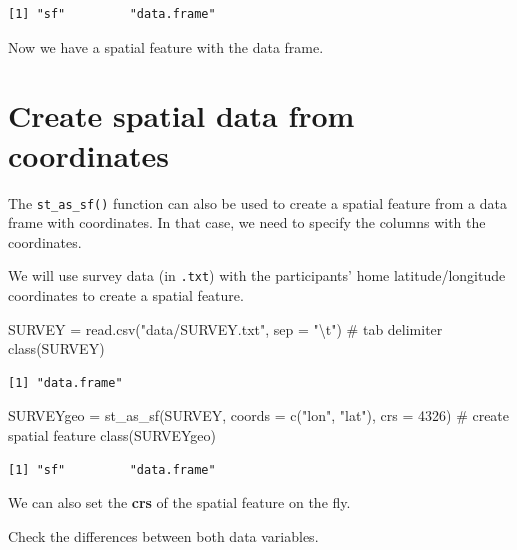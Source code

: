 \documentclass[
  letterpaper,
  DIV=11,
  numbers=noendperiod]{scrreprt}
\newenvironment{Shaded}{\begin{snugshade}}{\end{snugshade}}
\newcommand{\AttributeTok}[1]{\textcolor[rgb]{0.40,0.45,0.13}{#1}}
\newcommand{\CommentTok}[1]{\textcolor[rgb]{0.37,0.37,0.37}{#1}}
\newcommand{\DecValTok}[1]{\textcolor[rgb]{0.68,0.00,0.00}{#1}}
\newcommand{\FunctionTok}[1]{\textcolor[rgb]{0.28,0.35,0.67}{#1}}
\newcommand{\NormalTok}[1]{\textcolor[rgb]{0.00,0.23,0.31}{#1}}
\newcommand{\OtherTok}[1]{\textcolor[rgb]{0.00,0.23,0.31}{#1}}
\newcommand{\SpecialCharTok}[1]{\textcolor[rgb]{0.37,0.37,0.37}{#1}}
\newcommand{\StringTok}[1]{\textcolor[rgb]{0.13,0.47,0.30}{#1}}
\begin{document}
\begin{verbatim}
[1] "sf"         "data.frame"
\end{verbatim}

Now we have a spatial feature with the data frame.

\section{Create spatial data from
coordinates}\label{create-spatial-data-from-coordinates}

The \texttt{st\_as\_sf()} function can also be used to create a spatial
feature from a data frame with coordinates. In that case, we need to
specify the columns with the coordinates.

We will use survey data (in \texttt{.txt}) with the participants' home
latitude/longitude coordinates to create a spatial feature.

\begin{Shaded}
\begin{Highlighting}[]
\NormalTok{SURVEY }\OtherTok{=} \FunctionTok{read.csv}\NormalTok{(}\StringTok{"data/SURVEY.txt"}\NormalTok{, }\AttributeTok{sep =} \StringTok{"}\SpecialCharTok{\textbackslash{}t}\StringTok{"}\NormalTok{) }\CommentTok{\# tab delimiter}
\FunctionTok{class}\NormalTok{(SURVEY)}
\end{Highlighting}
\end{Shaded}

\begin{verbatim}
[1] "data.frame"
\end{verbatim}

\begin{Shaded}
\begin{Highlighting}[]
\NormalTok{SURVEYgeo }\OtherTok{=} \FunctionTok{st\_as\_sf}\NormalTok{(SURVEY, }\AttributeTok{coords =} \FunctionTok{c}\NormalTok{(}\StringTok{"lon"}\NormalTok{, }\StringTok{"lat"}\NormalTok{), }\AttributeTok{crs =} \DecValTok{4326}\NormalTok{) }\CommentTok{\# create spatial feature}
\FunctionTok{class}\NormalTok{(SURVEYgeo)}
\end{Highlighting}
\end{Shaded}

\begin{verbatim}
[1] "sf"         "data.frame"
\end{verbatim}

We can also set the \textbf{crs} of the spatial feature on the fly.

Check the differences between both data variables.
\end{document}
